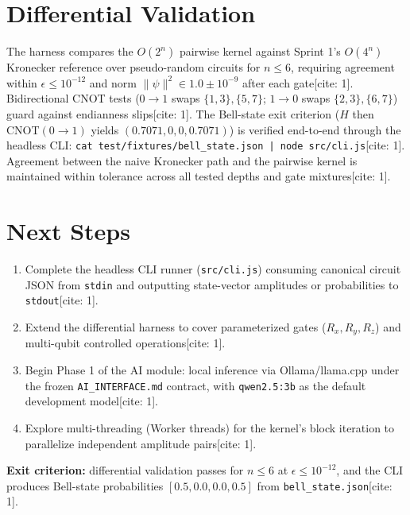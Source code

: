 \documentclass[conference]{IEEEtran}
\begin{document}
\section{Differential Validation}
The harness compares the $O(2^n)$ pairwise kernel against Sprint 1's $O(4^n)$ Kronecker reference over pseudo-random circuits for $n \le 6$, requiring agreement within $\epsilon \le 10^{-12}$ and norm $\lVert\psi\rVert^2 \in 1.0 \pm 10^{-9}$ after each gate[cite: 1]. Bidirectional CNOT tests ($0\to1$ swaps $\{1,3\},\{5,7\}$; $1\to0$ swaps $\{2,3\},\{6,7\}$) guard against endianness slips[cite: 1]. The Bell-state exit criterion ($H$ then CNOT$(0\to1)$ yields $(0.7071, 0, 0, 0.7071)$) is verified end-to-end through the headless CLI: \texttt{cat test/fixtures/bell\_state.json | node src/cli.js}[cite: 1]. Agreement between the naive Kronecker path and the pairwise kernel is maintained within tolerance across all tested depths and gate mixtures[cite: 1].

\section{Next Steps}
\begin{enumerate}
    \item Complete the headless CLI runner (\texttt{src/cli.js}) consuming canonical circuit JSON from \texttt{stdin} and outputting state-vector amplitudes or probabilities to \texttt{stdout}[cite: 1].
    \item Extend the differential harness to cover parameterized gates ($R_x, R_y, R_z$) and multi-qubit controlled operations[cite: 1].
    \item Begin Phase 1 of the AI module: local inference via Ollama/llama.cpp under the frozen \texttt{AI\_INTERFACE.md} contract, with \texttt{qwen2.5:3b} as the default development model[cite: 1].
    \item Explore multi-threading (Worker threads) for the kernel's block iteration to parallelize independent amplitude pairs[cite: 1].
\end{enumerate}

\textbf{Exit criterion:} differential validation passes for $n \le 6$ at $\epsilon \le 10^{-12}$, and the CLI produces Bell-state probabilities $[0.5, 0.0, 0.0, 0.5]$ from \texttt{bell\_state.json}[cite: 1].
\end{document}
